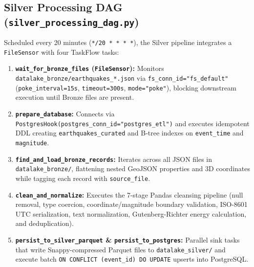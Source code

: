 \subsection{Silver Processing DAG (\texttt{silver\_processing\_dag.py})}
Scheduled every 20 minutes (\texttt{*/20 * * * *}), the Silver pipeline integrates a \texttt{FileSensor} with four TaskFlow tasks:
\begin{enumerate}
    \item \textbf{\texttt{wait\_for\_bronze\_files} (\texttt{FileSensor}):} Monitors \texttt{datalake\_bronze/earthquakes\_*.json} via \texttt{fs\_conn\_id="fs\_default"} (\texttt{poke\_interval=15s}, \texttt{timeout=300s}, \texttt{mode="poke"}), blocking downstream execution until Bronze files are present.
    \item \textbf{\texttt{prepare\_database}:} Connects via \texttt{PostgresHook(postgres\_conn\_id="postgres\_etl")} and executes idempotent DDL creating \texttt{earthquakes\_curated} and B-tree indexes on \texttt{event\_time} and \texttt{magnitude}.
    \item \textbf{\texttt{find\_and\_load\_bronze\_records}:} Iterates across all JSON files in \texttt{datalake\_bronze/}, flattening nested GeoJSON properties and 3D coordinates while tagging each record with \texttt{source\_file}.
    \item \textbf{\texttt{clean\_and\_normalize}:} Executes the 7-stage Pandas cleansing pipeline (null removal, type coercion, coordinate/magnitude boundary validation, ISO-8601 UTC serialization, text normalization, Gutenberg-Richter energy calculation, and deduplication).
    \item \textbf{\texttt{persist\_to\_silver\_parquet} \& \texttt{persist\_to\_postgres}:} Parallel sink tasks that write Snappy-compressed Parquet files to \texttt{datalake\_silver/} and execute batch \texttt{ON CONFLICT (event\_id) DO UPDATE} upserts into PostgreSQL.
\end{enumerate}
